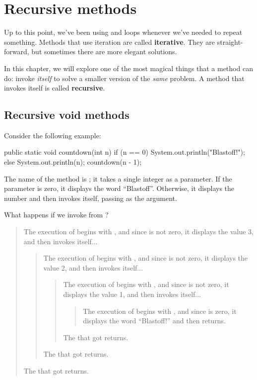 \chapter{Recursive methods}


Up to this point, we've been using  and  loops whenever we've needed to repeat something.
Methods that use iteration are called {\bf iterative}.
They are straight-forward, but sometimes there are more elegant solutions.

In this chapter, we will explore one of the most magical things that a method can do: invoke {\em itself} to solve a smaller version of the {\em same} problem.
A method that invokes itself is called {\bf recursive}.


\section{Recursive void methods}
\label{recursion}


Consider the following example:

\begin{code}
public static void countdown(int n) {
    if (n == 0) {
        System.out.println("Blastoff!");
    } else {
        System.out.println(n);
        countdown(n - 1);
    }
}
\end{code}

The name of the method is ; it takes a single integer as a parameter.
If the parameter is zero, it displays the word ``Blastoff''.
Otherwise, it displays the number and then invokes itself, passing  as the argument.

What happens if we invoke  from ?

\vspace{-1ex}
\begin{quote}
The execution of  begins with , and since  is not zero, it displays the value 3, and then invokes itself...
\begin{quote}
The execution of  begins with , and since  is not zero, it displays the value 2, and then invokes itself...
\begin{quote}
The execution of  begins with , and since  is not zero, it displays the value 1, and then invokes itself...
\begin{quote}
The execution of  begins with , and since  is zero, it displays the word ``Blastoff!'' and then returns.
\end{quote}
The  that got  returns.
\end{quote}
The  that got  returns.
\end{quote}
The  that got  returns.
\end{quote}
\vspace{-1ex}

